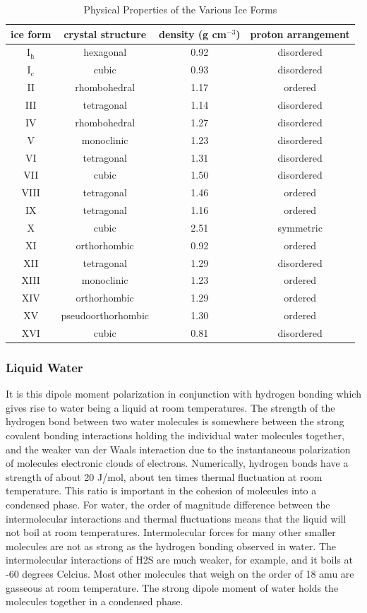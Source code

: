 \begin{table}[h]
\centering
\caption{Physical Properties of the Various Ice Forms }
\label{tab:iceProps}
\begin{tabular}{|cccc|}  \hline 
  ice form & crystal structure & density (g cm$^{-3}$) & proton arrangement  \\ \hline
  I$_\mathrm{h}$ & hexagonal & 0.92 & disordered \\
  I$_\mathrm{c}$ & cubic & 0.93 & disordered \\
  II & rhombohedral & 1.17 & ordered \\
  III & tetragonal & 1.14 & disordered \\
  IV & rhombohedral & 1.27 & disordered \\
  V & monoclinic & 1.23 & disordered \\
  VI & tetragonal & 1.31 & disordered \\
  VII & cubic & 1.50 & disordered \\
  VIII & tetragonal & 1.46 & ordered \\
  IX & tetragonal & 1.16 & ordered \\
  X & cubic & 2.51 & symmetric \\
  XI & orthorhombic & 0.92 & ordered \\
  XII & tetragonal & 1.29 & disordered \\
  XIII & monoclinic & 1.23 & ordered \\
  XIV & orthorhombic & 1.29 & ordered \\
  XV & pseudoorthorhombic & 1.30 & ordered \\
  XVI & cubic & 0.81 & disordered \\ \hline
\end{tabular}
\end{table}

\subsubsection{Liquid Water}
It is this dipole moment polarization in conjunction with hydrogen
bonding which gives rise to water being a liquid at room
temperatures. The strength of the hydrogen bond between two water
molecules is somewhere between the strong covalent bonding
interactions holding the individual water molecules together, and the
weaker van der Waals interaction due to the instantaneous polarization
of molecules electronic clouds of electrons. Numerically, hydrogen
bonds have a strength of about 20 J/mol, about ten times thermal
fluctuation at room temperature. This ratio is important in the
cohesion of molecules into a condensed phase. For water, the order of
magnitude difference between the intermolecular interactions and
thermal fluctuations means that the liquid will not boil at room
temperatures. Intermolecular forces for many other smaller molecules
are not as strong as the hydrogen bonding observed in water. The
intermolecular interactions of H2S are much weaker, for example, and
it boils at -60 degrees Celcius. Most other molecules that weigh on
the order of 18 amu are gasseous at room temperature. The strong
dipole moment of water holds the molecules together in a condensed
phase.

